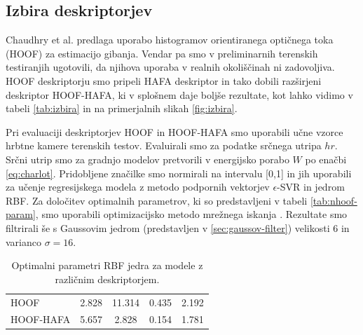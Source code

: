 \subsection{Izbira deskriptorjev}

Chaudhry et al. \cite{chaudhry2009histograms} predlaga uporabo histogramov orientiranega optičnega toka (HOOF) za estimacijo gibanja. Vendar pa smo v preliminarnih terenskih testiranjih \cite{koporec2017observation} ugotovili, da njihova uporaba v realnih okoliščinah ni zadovoljiva. HOOF deskriptorju smo pripeli HAFA deskriptor in tako dobili razširjeni deskriptor HOOF-HAFA, ki v splošnem daje boljše rezultate, kot lahko vidimo v tabeli \ref{tab:izbira} in na primerjalnih slikah \ref{fig:izbira}.

Pri evaluaciji deskriptorjev HOOF in HOOF-HAFA smo uporabili učne vzorce hrbtne kamere terenskih testov. Evaluirali smo za podatke srčnega utripa $hr$. Srčni utrip smo za gradnjo modelov pretvorili v energijsko porabo $W$ po enačbi \eqref{eq:charlot}. Pridobljene značilke smo normirali na intervalu [0,1] in jih uporabili za učenje regresijskega modela z metodo podpornih vektorjev $\epsilon$-SVR in jedrom RBF. Za določitev optimalnih parametrov, ki so predstavljeni v tabeli \ref{tab:nhoof-param}, smo uporabili optimizacijsko metodo mrežnega iskanja \cite{hsu2003practical}. Rezultate smo filtrirali še s Gaussovim jedrom (predstavljen v \ref{sec:gaussov-filter}) velikosti $6$ in varianco $\sigma=16$. 

\begin{table}[htb]
	\centering
    \begin{tabular}{l S[table-format=2.3] S[table-format=1.3] S[table-format=1.3] S[table-format=1.3]}
    \toprule
     &  & \thead{$\mathbf{\gamma}$} & \thead{$\mathbf{\epsilon}$} &  \\ 
    \midrule
    HOOF & 2.828 & 11.314 & 0.435 & 2.192 \\
    HOOF-HAFA & 5.657 & 2.828 & 0.154 & 1.781 \\
    \bottomrule
    \end{tabular}
    \caption[Optimalni parameteri RBF jedra modelov za izbiro deskriptorjev]{Optimalni parametri RBF jedra za modele z različnim deskriptorjem.}
    \label{tab:izbira-param}
\end{table}


